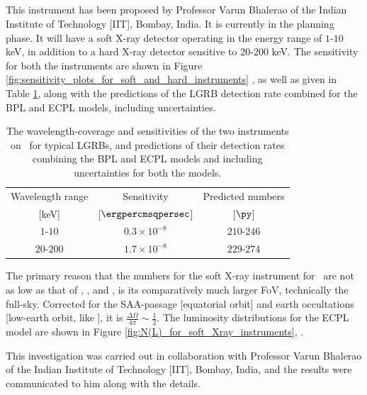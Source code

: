 \subsection{\D}
\label{subsec:predictions_for_Daksha--long}
This instrument has been proposed by Professor Varun Bhalerao of the Indian Institute of Technology [IIT], Bombay, India. It is currently in the planning phase. It will have a soft X-ray detector operating in the energy range of $1$-$10$ keV, in addition to a hard X-ray detector sensitive to $20$-$200$ keV. The sensitivity for both the instruments are shown in Figure \ref{fig:sensitivity_plots_for_soft_and_hard_instruments} \eR, as well as given in Table \ref{tab:predictions_for_Daksha--long}, along with the predictions of the LGRB detection rate combined for the BPL and ECPL models, including uncertainties.

\begin{table}[!htbp]
\caption[Specifications and long GRB detections estimates for \D]{The wavelength-coverage and sensitivities of the two instruments on \D\ for typical LGRBs, and predictions of their detection rates combining the BPL and ECPL models and including uncertainties for both the models.}
\label{tab:predictions_for_Daksha--long}
\begin{center}
\begin{tabular}{|c|c|c|}
\hline 
Wavelength range & Sensitivity & Predicted numbers\\
{[keV]} & [$\ergpercmsqpersec$] & [$\py$]\\
\hline
\hline
$1$-$10$ & $0.3 \times 10^{-8}$ & $210$-$246$\\
\hline
$20$-$200$ & $1.7 \times 10^{-8}$ & $229$-$274$\\
\hline
\end{tabular}
\end{center}
\end{table}

The primary reason that the numbers for the soft X-ray instrument for \D\ are not as low as that of \X, \C, and \A, is its comparatively much larger FoV, technically the full-sky. Corrected for the SAA-passage [equatorial orbit] and earth occultations [low-earth orbit, like \AS], it is $\frac{\Delta \Omega}{4\pi} \sim \frac{1}{2}$. The luminosity distributions for the ECPL model are shown in Figure \ref{fig:N(L)_for_soft_Xray_instruments}, \eR.

\begin{checkit}
This investigation was carried out in collaboration with Professor Varun Bhalerao of the Indian Institute of Technology [IIT], Bombay, India, and the results were communicated to him along with the details.
\end{checkit}






